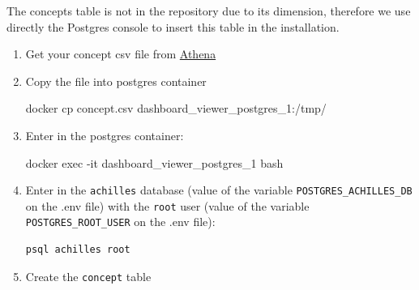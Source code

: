 \documentclass[
]{book}
\newenvironment{Shaded}{\begin{snugshade}}{\end{snugshade}}
\newcommand{\ExtensionTok}[1]{#1}
\newcommand{\NormalTok}[1]{#1}
\begin{document}
The concepts table is not in the repository due to its dimension, therefore we use directly the Postgres console to insert this table in the installation.

\begin{enumerate}
\def\labelenumi{\arabic{enumi}.}
\item
  Get your concept csv file from \href{https://athena.ohdsi.org/}{Athena}
\item
  Copy the file into postgres container

\begin{Shaded}
\begin{Highlighting}[]
\ExtensionTok{docker}\NormalTok{ cp concept.csv dashboard\_viewer\_postgres\_1:/tmp/}
\end{Highlighting}
\end{Shaded}
\item
  Enter in the postgres container:

\begin{Shaded}
\begin{Highlighting}[]
\ExtensionTok{docker}\NormalTok{ exec {-}it dashboard\_viewer\_postgres\_1 bash}
\end{Highlighting}
\end{Shaded}
\item
  Enter in the \texttt{achilles} database (value of the variable \texttt{POSTGRES\_ACHILLES\_DB} on the .env file) with the \texttt{root} user (value of the variable \texttt{POSTGRES\_ROOT\_USER} on the .env file):

\begin{verbatim}
psql achilles root
\end{verbatim}
\item
  Create the \texttt{concept} table


\end{enumerate}
\end{document}
